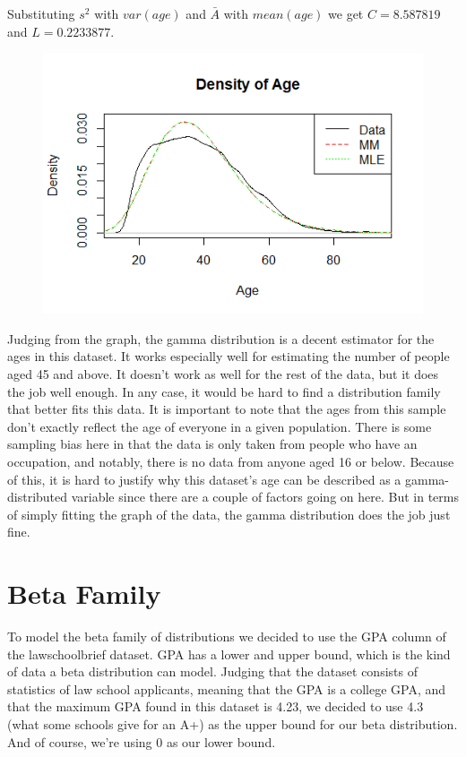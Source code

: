 \documentclass[12pt, a4paper, oneside]{report}
\begin{document}
Substituting $s^2$ with $var(age)$ and $\bar{A}$ with $mean(age)$ we get $C = 8.587819$ and $L = 0.2233877$.

\begin{figure}[h]
  \centering
  \includegraphics[width=0.7\linewidth]{gammaDensityA.png}
\end{figure}

Judging from the graph, the gamma distribution is a decent estimator for the ages in this dataset. It works especially well for estimating the number of people aged 45 and above. It doesn’t work as well for the rest of the data, but it does the job well enough. In any case, it would be hard to find a distribution family that better fits this data. 
It is important to note that the ages from this sample don’t exactly reflect the age of everyone in a given population. There is some sampling bias here in that the data is only taken from people who have an occupation, and notably, there is no data from anyone aged 16 or below. Because of this, it is hard to justify why this dataset’s age can be described as a gamma-distributed variable since there are a couple of factors going on here.
But in terms of simply fitting the graph of the data, the gamma distribution does the job just fine.


















\newpage
\section*{Beta Family}
To model the beta family of distributions we decided to use the GPA column of the lawschoolbrief dataset. GPA has a lower and upper bound, which is the kind of data a beta distribution can model. Judging that the dataset consists of statistics of law school applicants, meaning that the GPA is a college GPA, and that the maximum GPA found in this dataset is 4.23, we decided to use 4.3 (what some schools give for an A+) as the upper bound for our beta distribution. And of course, we’re using 0 as our lower bound. 
\end{document}
